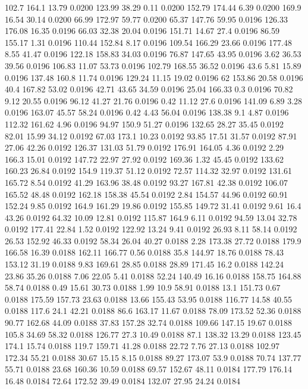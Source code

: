 102.7	164.1	13.79	0.0200
123.99	38.29	0.11	0.0200
152.79	174.44	6.39	0.0200
169.9	16.54	30.14	0.0200
66.99	172.97	59.77	0.0200
65.37	147.76	59.95	0.0196
126.33	176.08	16.35	0.0196
66.03	32.38	20.04	0.0196
151.71	14.67	27.4	0.0196
86.59	155.17	1.31	0.0196
110.44	152.84	8.17	0.0196
109.54	166.29	23.66	0.0196
177.48	8.55	41.47	0.0196
122.18	158.83	34.03	0.0196
76.87	147.65	43.95	0.0196
3.62	36.53	39.56	0.0196
106.83	11.07	53.73	0.0196
102.79	168.55	36.52	0.0196
43.6	5.81	15.89	0.0196
137.48	160.8	11.74	0.0196
129.24	11.15	19.02	0.0196
62	153.86	20.58	0.0196
40.4	167.82	53.02	0.0196
42.71	43.65	34.59	0.0196
25.04	166.33	0.3	0.0196
70.82	9.12	20.55	0.0196
96.12	41.27	21.76	0.0196
0.42	11.12	27.6	0.0196
141.09	6.89	3.28	0.0196
163.07	45.57	58.24	0.0196
0.42	4.43	56.04	0.0196
138.38	9.1	4.87	0.0196
112.32	161.62	4.96	0.0196
94.97	150.9	51.27	0.0196
132.65	28.27	35.45	0.0192
82.01	15.99	34.12	0.0192
67.03	173.1	10.23	0.0192
93.85	17.51	31.57	0.0192
87.91	27.06	42.26	0.0192
126.37	131.03	51.79	0.0192
176.91	164.05	4.36	0.0192
2.29	166.3	15.01	0.0192
147.72	22.97	27.92	0.0192
169.36	1.32	45.45	0.0192
133.62	160.23	26.84	0.0192
154.9	119.37	51.12	0.0192
72.57	114.32	32.97	0.0192
131.61	165.72	8.54	0.0192
41.29	163.96	38.48	0.0192
93.27	167.81	42.38	0.0192
106.07	165.52	48.48	0.0192
162.18	158.38	45.54	0.0192
2.84	154.57	44.96	0.0192
60.91	152.24	9.85	0.0192
164.9	161.29	19.86	0.0192
155.85	149.72	31.41	0.0192
9.61	16.4	43.26	0.0192
64.32	10.09	12.81	0.0192
115.87	164.9	6.11	0.0192
94.59	13.04	32.78	0.0192
177.41	22.84	1.52	0.0192
122.92	13.24	9.41	0.0192
26.93	8.11	58.14	0.0192
26.53	152.92	46.33	0.0192
58.34	26.04	40.27	0.0188
2.28	173.38	27.72	0.0188
179.9	166.58	16.39	0.0188
162.11	166.77	0.56	0.0188
35.8	144.97	18.76	0.0188
78.43	153.12	31.19	0.0188
9.83	169.61	28.85	0.0188
28.89	171.45	16.2	0.0188
142.24	23.86	35.26	0.0188
7.06	22.05	5.41	0.0188
52.24	140.49	16.16	0.0188
158.75	164.88	58.74	0.0188
0.49	15.61	30.73	0.0188
1.99	10.9	58.91	0.0188
13.1	151.73	0.67	0.0188
175.59	157.73	23.63	0.0188
13.66	155.43	53.95	0.0188
116.77	14.58	40.55	0.0188
117.6	24.1	42.21	0.0188
86.6	163.17	11.67	0.0188
78.09	173.52	52.36	0.0188
90.77	162.68	44.09	0.0188
37.83	157.28	32.74	0.0188
109.66	147.15	19.67	0.0188
105.8	34.69	58.32	0.0188
126.77	27.3	10.49	0.0188
87.1	138.32	13.29	0.0188
123.45	174.1	15.74	0.0188
119.7	159.71	41.28	0.0188
22.72	7.76	27.13	0.0188
102.97	172.34	55.21	0.0188
30.67	15.15	8.15	0.0188
89.27	173.07	53.9	0.0188
70.74	137.77	55.71	0.0188
23.68	160.36	10.59	0.0188
69.57	152.67	48.11	0.0184
177.79	176.14	16.48	0.0184
72.64	172.52	39.49	0.0184
132.07	27.95	24.24	0.0184

